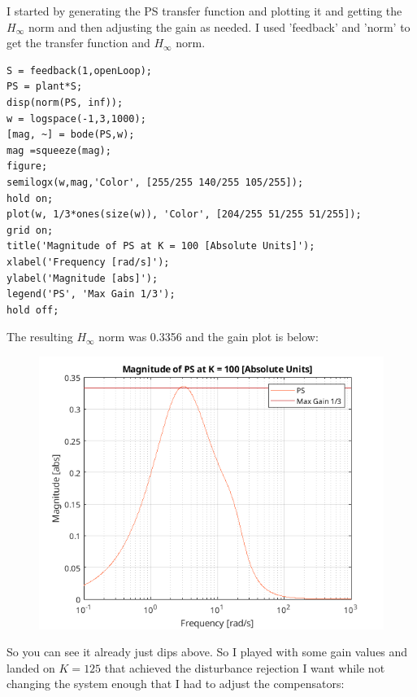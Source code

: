 \documentclass{article}
\begin{document}
I started by generating the PS transfer function and plotting it and getting the $H_{\infty}$ norm and then adjusting the gain as needed.
I used 'feedback' and 'norm' to get the transfer function and $H_{\infty}$ norm.

\begin{lstlisting}[style=matlabstyle]
S = feedback(1,openLoop);
PS = plant*S;
disp(norm(PS, inf));
w = logspace(-1,3,1000);
[mag, ~] = bode(PS,w);
mag =squeeze(mag);
figure;
semilogx(w,mag,'Color', [255/255 140/255 105/255]);
hold on;
plot(w, 1/3*ones(size(w)), 'Color', [204/255 51/255 51/255]);
grid on;
title('Magnitude of PS at K = 100 [Absolute Units]');
xlabel('Frequency [rad/s]');
ylabel('Magnitude [abs]');
legend('PS', 'Max Gain 1/3');
hold off;    
\end{lstlisting}

The resulting $H_{\infty}$ norm was 0.3356 and the gain plot is below:

\begin{figure}[H]
    \centering
    \includegraphics[width=\textwidth]{psk100.png}
\end{figure}

So you can see it already just dips above.
So I played with some gain values and landed on $K = 125$ that achieved the disturbance rejection I want while not changing the system enough that I had to adjust the compensators:
\end{document}
